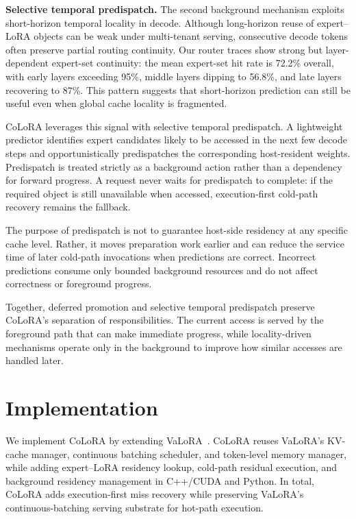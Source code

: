 \documentclass[sigplan,anonymous,review,10pt]{acmart}
\begin{document}
\noindent\textbf{Selective temporal predispatch.}
The second background mechanism exploits short-horizon temporal locality in decode. Although long-horizon reuse of expert--LoRA objects can be weak under multi-tenant serving, consecutive decode tokens often preserve partial routing continuity. Our router traces show strong but layer-dependent expert-set continuity: the mean expert-set hit rate is 72.2\% overall, with early layers exceeding 95\%, middle layers dipping to 56.8\%, and late layers recovering to 87\%. This pattern suggests that short-horizon prediction can still be useful even when global cache locality is fragmented.

CoLoRA leverages this signal with selective temporal predispatch. A lightweight predictor identifies expert candidates likely to be accessed in the next few decode steps and opportunistically predispatches the corresponding host-resident weights. Predispatch is treated strictly as a background action rather than a dependency for forward progress. A request never waits for predispatch to complete: if the required object is still unavailable when accessed, execution-first cold-path recovery remains the fallback.

The purpose of predispatch is not to guarantee host-side residency at any specific cache level. Rather, it moves preparation work earlier and can reduce the service time of later cold-path invocations when predictions are correct. Incorrect predictions consume only bounded background resources and do not affect correctness or foreground progress.

Together, deferred promotion and selective temporal predispatch preserve CoLoRA's separation of responsibilities. The current access is served by the foreground path that can make immediate progress, while locality-driven mechanisms operate only in the background to improve how similar accesses are handled later.


\section{Implementation}
\label{sec:implementation}

We implement CoLoRA by extending VaLoRA~\cite{mi2025empower}. CoLoRA reuses VaLoRA's KV-cache manager, continuous batching scheduler, and token-level memory manager, while adding expert--LoRA residency lookup, cold-path residual execution, and background residency management in C++/CUDA and Python. In total, CoLoRA adds execution-first miss recovery while preserving VaLoRA's continuous-batching serving substrate for hot-path execution.
\end{document}
